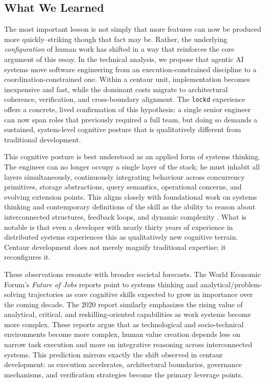 \documentclass[11pt, a4paper, twocolumn]{article} %
\begin{document}
\newpage
\subsection*{What We Learned}

The most important lesson is not simply that more features can now be produced more quickly--striking though that fact may be. Rather, the underlying \emph{configuration} of human work has shifted in a way that reinforces the core argument of this essay. In the technical analysis, we propose that agentic AI systems move software engineering from an execution-constrained discipline to a coordination-constrained one. Within a centaur unit, implementation becomes inexpensive and fast, while the dominant costs migrate to architectural coherence, verification, and cross-boundary alignment. The \texttt{lockd} experience offers a concrete, lived confirmation of this hypothesis: a single senior engineer can now span roles that previously required a full team, but doing so demands a sustained, system-level cognitive posture that is qualitatively different from traditional development.

This cognitive posture is best understood as an applied form of systems thinking. The engineer can no longer occupy a single layer of the stack; he must inhabit all layers simultaneously, continuously integrating behaviour across concurrency primitives, storage abstractions, query semantics, operational concerns, and evolving extension points. This aligns closely with foundational work on systems thinking \citep{senge1990, richmond1993, sterman2000} and contemporary definitions of the skill as the ability to reason about interconnected structures, feedback loops, and dynamic complexity \citep{arnoldwade2015}. What is notable is that even a developer with nearly thirty years of experience in distributed systems experiences this as qualitatively new cognitive terrain. Centaur development does not merely magnify traditional expertise; it reconfigures it.

These observations resonate with broader societal forecasts. The World Economic Forum’s \emph{Future of Jobs} reports \citep{wef2023,wef2018} point to systems thinking and analytical/problem-solving trajectories as core cognitive skills expected to grow in importance over the coming decade. The 2020 report \citep{wef2020} similarly emphasizes the rising value of analytical, critical, and reskilling-oriented capabilities as work systems become more complex. These reports argue that as technological and socio-technical environments become more complex, human value creation depends less on narrow task execution and more on integrative reasoning across interconnected systems. This prediction mirrors exactly the shift observed in centaur development: as execution accelerates, architectural boundaries, governance mechanisms, and verification strategies become the primary leverage points.
\end{document}
